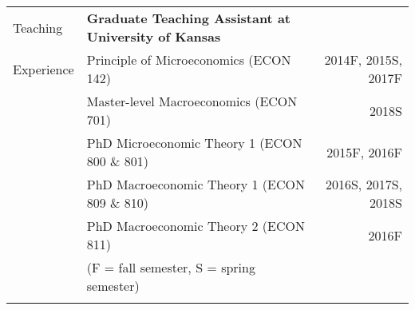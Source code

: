 \documentclass[letterpaper, 11pt]{article}
\begin{document}
\noindent \begin{tabular}{@{} p{3cm} p{10cm} r}
	\Large{Teaching}   & \textbf{Graduate Teaching Assistant at University of Kansas} \\
	\Large{Experience} & \hspace{5mm}Principle of Microeconomics (ECON 142) & 2014F, 2015S, 2017F \\
	& \hspace{5mm}Master-level Macroeconomics (ECON 701) & 2018S \\
	& \hspace{5mm}PhD Microeconomic Theory 1 (ECON 800 \& 801) & 2015F, 2016F \\
	& \hspace{5mm}PhD Macroeconomic Theory 1 (ECON 809 \& 810) & 2016S, 2017S, 2018S \\
	& \hspace{5mm}PhD Macroeconomic Theory 2 (ECON 811) & 2016F \\
	& \hspace{5mm} (F = fall semester, S = spring semester) \\
	& \\
\end{tabular}
\end{document}
